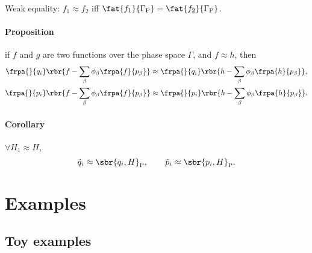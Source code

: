 \documentclass[a4paper,11pt]{article}
\begin{document}
Weak equality: $f_1 \approx f_2$ iff $\fat{f_1}{\Gamma_\text{P}} = 
\fat{f_2}{\Gamma_\text{P}}$.

\paragraph{Proposition} if $f$ and $g$ are two functions over the phase space 
$\Gamma$, and $f \approx h$, then
\begin{align}
\frpa{}{q_i} \rbr{f-\sum_\beta \phi_\beta \frpa{f}{p_\beta}} &\approx 
\frpa{}{q_i} \rbr{h-\sum_\beta \phi_\beta \frpa{h}{p_\beta}}, \\
\frpa{}{p_i} \rbr{f-\sum_\beta \phi_\beta \frpa{f}{p_\beta}} &\approx 
\frpa{}{p_i} \rbr{h-\sum_\beta \phi_\beta \frpa{h}{p_\beta}}.
\end{align}

\paragraph{Corollary}
$\forall H_1 \approx H$,
\begin{equation}
\dot{q}_i \approx \sbr{q_i, H}_\text{P},\qquad
\dot{p}_i \approx \sbr{p_i, H}_\text{P}.
\end{equation}







\section{Examples}




\subsection{Toy examples}
\end{document}
